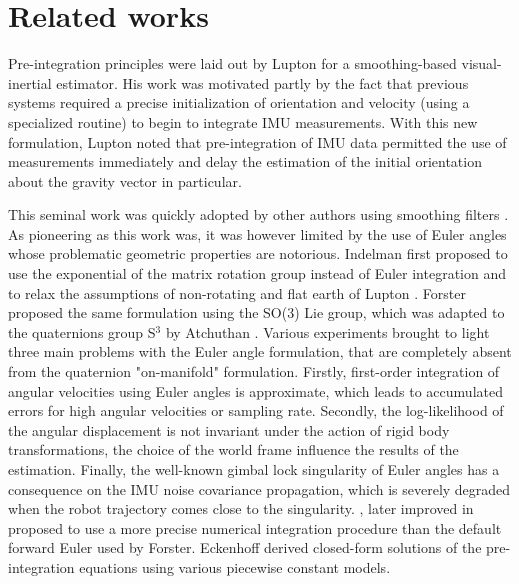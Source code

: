 \section{Related works}

Pre-integration principles were laid out by Lupton \cite{lupton-09} for a smoothing-based visual-inertial estimator. His work was motivated partly 
by the fact that previous systems required a precise initialization of orientation and velocity (using a specialized routine) to begin to integrate IMU measurements. 
With this new formulation, Lupton noted that pre-integration of IMU data permitted the use of measurements immediately and delay the estimation of the initial 
orientation about the gravity vector in particular. 

This seminal work was quickly adopted by other authors using smoothing filters \cite{carlone2014eliminating}. As pioneering as this work was, it was however 
limited by the use of Euler angles whose problematic geometric properties are notorious. Indelman \cite{Indelman-2013-7768} first proposed to use the exponential of the 
matrix rotation group instead of Euler integration and to relax the assumptions of non-rotating and flat earth of Lupton \cite{lupton-09}. Forster \cite{forster2015imu, forster2017-TRO}
proposed the same formulation using the SO(3) Lie group, which was adapted to the quaternions group S$^3$ by Atchuthan \cite{atchuthan-18-thesis}. Various experiments brought to light three main problems with the Euler angle formulation, that are completely absent 
from the quaternion "on-manifold" formulation. Firstly, first-order integration of angular velocities using Euler angles is approximate, which leads to accumulated errors 
for high angular velocities or sampling rate. Secondly, the log-likelihood of the angular displacement is not invariant under the action of rigid body transformations, 
\eg the choice of the world frame influence the results of the estimation. Finally, the well-known gimbal lock singularity of Euler angles has a consequence 
on the IMU noise covariance propagation, which is severely degraded when the robot trajectory comes close to the singularity. 
\cite{shen2015tightly}, later improved in \cite{qin2018vins} proposed to use a more precise numerical integration procedure than the default forward Euler used by Forster. 
Eckenhoff \cite{eckenhoff2019closed} derived closed-form solutions of the pre-integration equations using various piecewise constant models.

